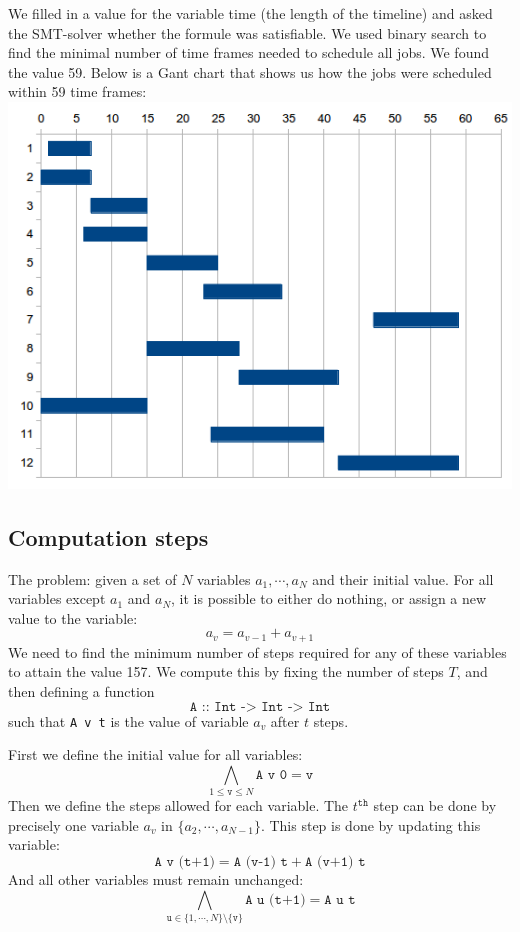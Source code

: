 \documentclass[12pt]{article}
\begin{document}
We filled in a value for the variable time (the length of the timeline) 
and asked the SMT-solver whether the formule was satisfiable. 
We used binary search to find the minimal number of time frames needed to schedule all jobs. 
We found the value 59. 
Below is a Gant chart that shows us how the jobs were scheduled within 59 time frames:
\includegraphics[width=15cm]{gantchart.png}

\subsection*{Computation steps}
The problem: given a set of $N$ variables $a_1, \cdots, a_N$ and their initial value.
For all variables except $a_1$ and $a_N$, it is possible to either do nothing, or assign a new value to the variable:
\[ a_v = a_{v-1} + a_{v+1} \]
We need to find the minimum number of steps required for any of these variables to attain the value 157.
We compute this by fixing the number of steps $T$, and then defining a function
\[\texttt{A :: Int -> Int -> Int}\]
such that \texttt{A v t} is the value of variable $a_v$ after $t$ steps.

First we define the initial value for all variables:
\[ \bigwedge_{1 \le \texttt{v} \le N} \texttt{A v 0} = \texttt{v} \]
Then we define the steps allowed for each variable.
The $t^\mathtt{th}$ step can be done by precisely one variable $a_v$ in $\{ a_2, \cdots, a_{N-1} \}$.
This step is done by updating this variable:
\[\texttt{A v (t+1)} = \texttt{A (v-1) t} + \texttt{A (v+1) t}\]
And all other variables must remain unchanged:
\[\bigwedge_{ \texttt{u} \in \{1, \cdots, N\} \setminus \{ \texttt{v} \} } \texttt{A u (t+1)} = \texttt{A u t}\]
\end{document}
